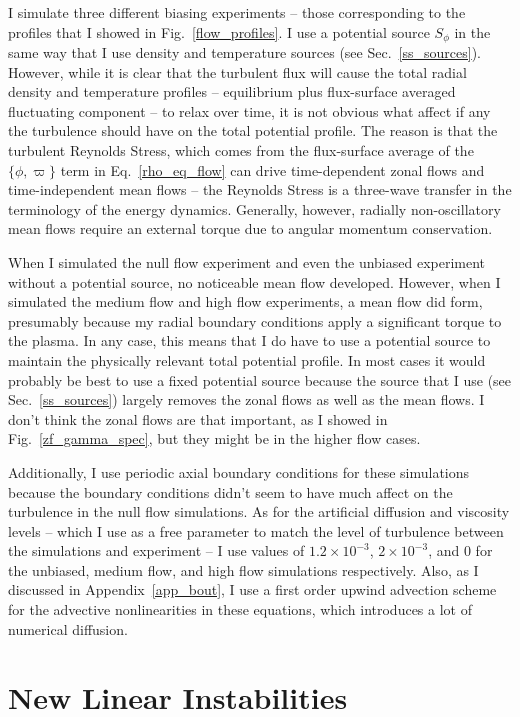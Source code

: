 I simulate three different biasing experiments -- those corresponding to the profiles that I showed in Fig.~\ref{flow_profiles}. I use a potential source $S_\phi$ in the same way that I
use density and temperature sources (see Sec.~\ref{ss_sources}). However, while it is clear that the turbulent flux will cause the total radial density and temperature profiles
-- equilibrium plus flux-surface averaged fluctuating component -- to relax over time, it is not obvious what affect if any the turbulence should have on the total potential profile. 
The reason is that the turbulent Reynolds Stress, which comes from the flux-surface average of the $\{\phi,\varpi \}$ term in Eq.~\ref{rho_eq_flow} 
can drive time-dependent zonal flows and time-independent mean flows -- the Reynolds Stress is a three-wave transfer in the terminology of the energy dynamics. Generally, however,
radially non-oscillatory mean flows require an external torque due to angular momentum conservation.

When I simulated the null flow experiment and even the unbiased experiment without a potential source, no noticeable mean flow developed. 
However, when I simulated the medium flow and high flow experiments, a mean
flow did form, presumably because my radial boundary conditions apply a significant torque to the plasma. In any case, this means that I do have to use a potential source to maintain
the physically relevant total potential profile. In most cases it would probably be best to use a fixed potential source because the source that I use (see Sec.~\ref{ss_sources})
largely removes the zonal flows as well as the mean flows. I don't think the zonal flows are that important, as I showed in Fig.~\ref{zf_gamma_spec}, but they might be in the higher flow
cases.

Additionally, I use periodic axial boundary conditions for these simulations because the boundary conditions didn't seem to have much affect on the turbulence in the null flow simulations.
As for the artificial diffusion and viscosity levels -- which I use as a free parameter to match the level of turbulence between the simulations and experiment -- I use values of
$1.2 \times 10^{-3}$, $2 \times 10^{-3}$, and $0$ for the unbiased, medium flow, and high flow simulations respectively. Also, as I discussed in Appendix~\ref{app_bout}, I use a first order
upwind advection scheme for the advective nonlinearities in these equations, which introduces a lot of numerical diffusion.


\section{New Linear Instabilities}
\label{s_flow_inst}

